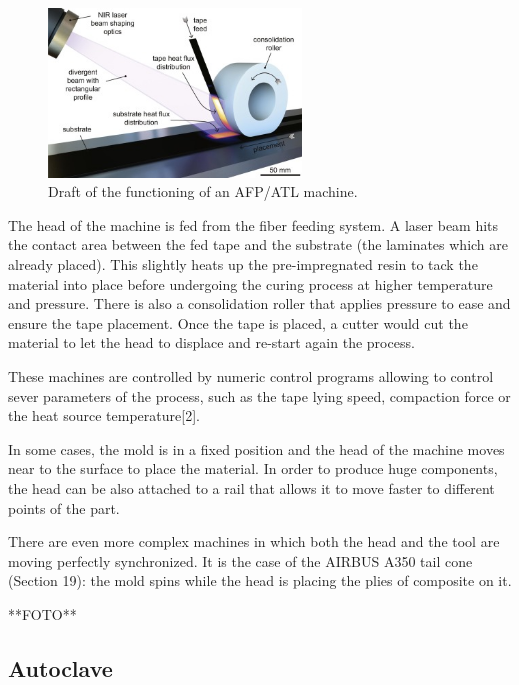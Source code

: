 \begin{figure}[h]
	\centering
	\includegraphics[width=0.6\textwidth]{img/afp_atl_machine.jpg}
	\caption{Draft of the functioning of an AFP/ATL machine.}
	\label{fig:afp-atl_machine}
\end{figure}

The head of the machine is fed from the fiber feeding system. A laser beam hits the contact area between the fed tape and the substrate (the laminates which are already placed). This slightly heats up the pre-impregnated resin to tack the material into place before undergoing the curing process at higher temperature and pressure. There is also a consolidation roller that applies pressure to ease and ensure the tape placement. Once the tape is placed, a cutter would cut the material to let the head to displace and re-start again the process.

These machines are controlled by numeric control programs allowing to control sever parameters of the process, such as the tape lying speed, compaction force or the heat source temperature[2].

In some cases, the mold is in a fixed position and the head of the machine moves near to the surface to place the material. In order to produce huge components, the head can be also attached to a rail that allows it to move faster to different points of the part.

There are even more complex machines in which both the head and the tool are moving perfectly synchronized. It is the case of the AIRBUS A350 tail cone (Section 19): the mold spins while the head is placing the plies of composite on it.

**FOTO**

\subsection{Autoclave}

